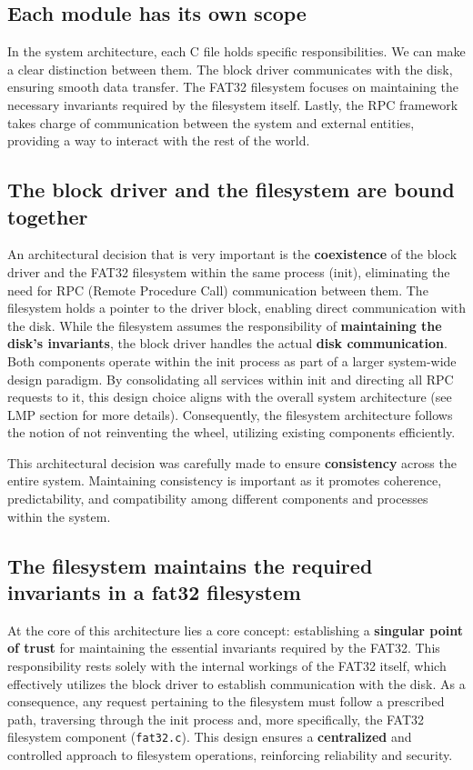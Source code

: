 \subsection{Each module has its own scope}
In the system architecture, each C file holds specific responsibilities. We can make a clear distinction between them. The block driver communicates with the disk, ensuring smooth data transfer. The FAT32 filesystem focuses on maintaining the necessary invariants required by the filesystem itself. Lastly, the RPC framework takes charge of communication between the system and external entities, providing a way to interact with the rest of the world.

\subsection{The block driver and the filesystem are bound together}

An architectural decision that is very important is the \textbf{coexistence} of the block driver and the FAT32 filesystem within the same process (init), eliminating the need for RPC (Remote Procedure Call) communication between them. The filesystem holds a pointer to the driver block, enabling direct communication with the disk. While the filesystem assumes the responsibility of \textbf{maintaining the disk's invariants}, the block driver handles the actual \textbf{disk communication}. Both components operate within the init process as part of a larger system-wide design paradigm. By consolidating all services within init and directing all RPC requests to it, this design choice aligns with the overall system architecture (see LMP section for more details). Consequently, the filesystem architecture follows the notion of not reinventing the wheel, utilizing existing components efficiently.

This architectural decision was carefully made to ensure \textbf{consistency} across the entire system. Maintaining consistency is important as it promotes coherence, predictability, and compatibility among different components and processes within the system.

\subsection{The filesystem maintains the required invariants in a fat32 filesystem}

At the core of this architecture lies a core concept: establishing a \textbf{singular point of trust} for maintaining the essential invariants required by the FAT32. This responsibility rests solely with the internal workings of the FAT32 itself, which effectively utilizes the block driver to establish communication with the disk. As a consequence, any request pertaining to the filesystem must follow a prescribed path, traversing through the init process and, more specifically, the FAT32 filesystem component (\texttt{fat32.c}). This design ensures a \textbf{centralized} and controlled approach to filesystem operations, reinforcing reliability and security.


